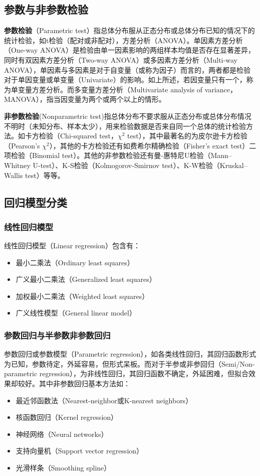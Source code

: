 \documentclass[11pt]{article}
\begin{document}
\subsection{参数与非参数检验}

\textbf{参数检验}（Parametric test）指总体分布服从正态分布或总体分布已知的情况下的统计检验，如t检验（配对或非配对），方差分析（ANOVA）。单因素方差分析（One-way ANOVA）是检验由单一因素影响的两组样本均值是否存在显著差异，同时有双因素方差分析（Two-way ANOVA）或多因素方差分析（Multi-way ANOVA），单因素与多因素是对于自变量（或称为因子）而言的，两者都是检验对于单因变量或单变量（Univariate）的影响。如上所述，若因变量只有一个，称为单变量方差分析。而多变量方差分析（Multivariate analysis of variance，MANOVA），指当因变量为两个或两个以上的情形。

\textbf{非参数检验}(Nonparametric test)指总体分布不要求服从正态分布或总体分布情况不明时（未知分布、样本太少），用来检验数据是否来自同一个总体的统计检验方法。如卡方检验（Chi-squared test，$\chi^2$ test），其中最著名的为皮尔逊卡方检验（Pearson's $\chi^2$），其他的卡方检验还有如费希尔精确检验（Fisher's exact test）二项检验（Binomial test）。其他的非参数检验还有曼-惠特尼U检验（Mann–Whitney U-test）、K-S检验（Kolmogorov-Smirnov test）、K-W检验（Kruskal–Wallis test）等等。

\subsection{回归模型分类}

\subsubsection*{线性回归模型}
线性回归模型（Linear regression）包含有：
\begin{itemize}
    \item 最小二乘法（Ordinary least squares）
    \item 广义最小二乘法（Generalized least squares）
    \item 加权最小二乘法（Weighted least squares）
    \item 广义线性模型（General linear model）
\end{itemize}

\subsubsection*{参数回归与半参数非参数回归}

参数回归或参数模型（Parametric regression），如各类线性回归，其回归函数形式为已知，参数待定，外延容易，但形式呆板。而对于半参或非参回归（Semi/Non-parametric regression），为非线性回归，其回归函数不确定，外延困难，但拟合效果却较好。其中非参数回归基本方法如：
\begin{itemize}
    \item 最近邻函数法（Nearest-neighbor或K-nearest neighbors）
    \item 核函数回归（Kernel regression）
    \item 神经网络（Neural networks）
    \item 支持向量机（Support vector regression）
    \item 光滑样条（Smoothing spline）
\end{itemize}
\end{document}
